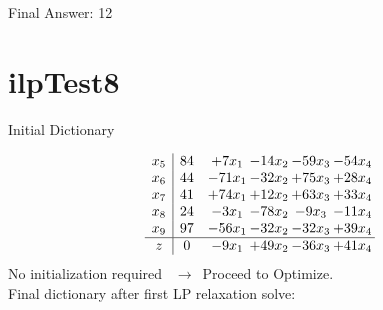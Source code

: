 \documentclass[11pt]{article}
\begin{document}
Final Answer: 12

\section{ilpTest8}

Initial Dictionary 

\[\begin{array}{c| c c@{\hskip 2pt} c@{\hskip 2pt} c@{\hskip 2pt} c@{\hskip 2pt} }
 x_{5}   &  84 & + 7 x_{1} & -14 x_{2} & -59 x_{3} & -54 x_{4}\\
 x_{6}   &  44 & -71 x_{1} & -32 x_{2} & + 75 x_{3} & + 28 x_{4}\\
 x_{7}   &  41 & + 74 x_{1} & + 12 x_{2} & + 63 x_{3} & + 33 x_{4}\\
 x_{8}   &  24 & -3 x_{1} & -78 x_{2} & -9 x_{3} & -11 x_{4}\\
 x_{9}   &  97 & -56 x_{1} & -32 x_{2} & -32 x_{3} & + 39 x_{4}\\
\hline
z    &  0 & -9 x_{1} & + 49 x_{2} & -36 x_{3} & + 41 x_{4}\\
\end{array}\]
No initialization required \ $\rightarrow$\  Proceed to Optimize. \\ 
Final dictionary after first LP relaxation solve: 
\end{document}
